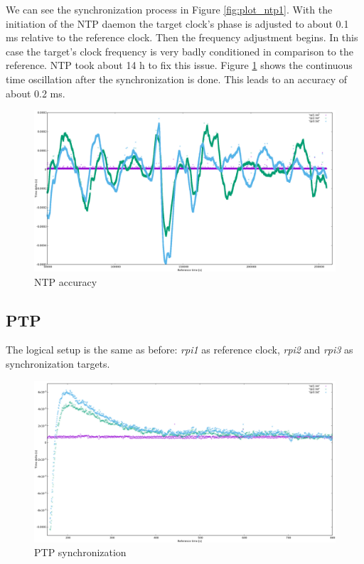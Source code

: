 We can see the synchronization process in Figure \ref{fig:plot_ntp1}. With the initiation of the NTP daemon the target clock's phase is adjusted to about 0.1 ms relative to the reference clock. Then the frequency adjustment begins. In this case the target’s clock frequency is very badly conditioned in comparison to the reference. NTP took about 14 h to fix this issue. Figure \ref{fig:plot_ntp2} shows the continuous time oscillation after the synchronization is done. This leads to an accuracy of about 0.2 ms.

\begin{figure}[tb]
	\centering
	\includegraphics[width=1.0\textwidth]{figures/plot_ntp2.png}
	\caption{NTP accuracy}
	\label{fig:plot_ntp2}
\end{figure}

\subsection{PTP}

The logical setup is the same as before: \textit{rpi1} as reference clock, \textit{rpi2} and \textit{rpi3} as synchronization targets.

\begin{figure}[tb]
	\centering
	\includegraphics[width=1.0\textwidth]{figures/plot_ptp1.png}
	\caption{PTP synchronization}
	\label{fig:plot_ptp1}
\end{figure}


